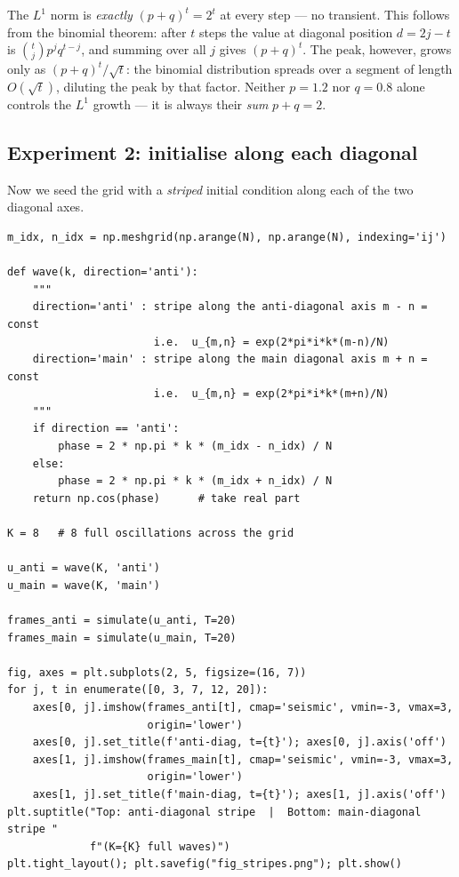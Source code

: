 \documentclass[11pt]{article}
\begin{document}
\noindent
The $L^1$ norm is \emph{exactly} $(p+q)^t = 2^t$ at every step --- no transient.
This follows from the binomial theorem: after $t$ steps the value at diagonal
position $d = 2j-t$ is $\binom{t}{j}p^j q^{t-j}$, and summing over all $j$
gives $(p+q)^t$.  The peak, however, grows only as $(p+q)^t/\sqrt{t}$:
the binomial distribution spreads over a segment of length $O(\sqrt{t})$,
diluting the peak by that factor.
Neither $p = 1.2$ nor $q = 0.8$ alone controls the $L^1$ growth --- it is
always their \emph{sum} $p + q = 2$.


\subsection*{Experiment 2: initialise along each diagonal}

Now we seed the grid with a \emph{striped} initial condition along
each of the two diagonal axes.

\begin{lstlisting}
m_idx, n_idx = np.meshgrid(np.arange(N), np.arange(N), indexing='ij')

def wave(k, direction='anti'):
    """
    direction='anti' : stripe along the anti-diagonal axis m - n = const
                       i.e.  u_{m,n} = exp(2*pi*i*k*(m-n)/N)
    direction='main' : stripe along the main diagonal axis m + n = const
                       i.e.  u_{m,n} = exp(2*pi*i*k*(m+n)/N)
    """
    if direction == 'anti':
        phase = 2 * np.pi * k * (m_idx - n_idx) / N
    else:
        phase = 2 * np.pi * k * (m_idx + n_idx) / N
    return np.cos(phase)      # take real part

K = 8   # 8 full oscillations across the grid

u_anti = wave(K, 'anti')
u_main = wave(K, 'main')

frames_anti = simulate(u_anti, T=20)
frames_main = simulate(u_main, T=20)

fig, axes = plt.subplots(2, 5, figsize=(16, 7))
for j, t in enumerate([0, 3, 7, 12, 20]):
    axes[0, j].imshow(frames_anti[t], cmap='seismic', vmin=-3, vmax=3,
                      origin='lower')
    axes[0, j].set_title(f'anti-diag, t={t}'); axes[0, j].axis('off')
    axes[1, j].imshow(frames_main[t], cmap='seismic', vmin=-3, vmax=3,
                      origin='lower')
    axes[1, j].set_title(f'main-diag, t={t}'); axes[1, j].axis('off')
plt.suptitle("Top: anti-diagonal stripe  |  Bottom: main-diagonal stripe "
             f"(K={K} full waves)")
plt.tight_layout(); plt.savefig("fig_stripes.png"); plt.show()
\end{lstlisting}
\end{document}
